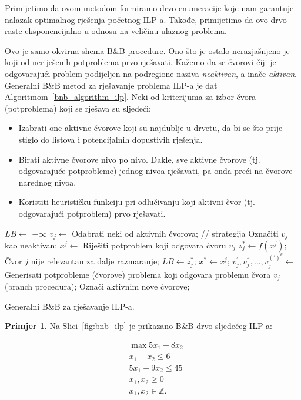 \documentclass[a4paper, utf8, 11pt, colorlinks]{book}
\theoremstyle{definition}
\newtheorem{primjer}{Primjer}[chapter]
\begin{document}
Primijetimo da ovom metodom formiramo drvo enumeracije koje nam garantuje nalazak optimalnog rješenja početnog ILP-a. Takođe, primijetimo da ovo drvo raste eksponencijalno u odnosu na veličinu ulaznog problema. 

  Ovo je samo okvirna shema B\&B procedure. Ono što je ostalo nerazjašnjeno je koji od neriješenih potproblema prvo rješavati. Kažemo da se čvorovi čiji je odgovarajući problem podijeljen na podregione naziva \emph{neaktivan}, a inače \emph{aktivan}. Generalni B\&B metod za rješavanje problema ILP-a je dat   Algoritmom~\ref{bnb_algorithm_ilp}.  Neki od kriterijuma za izbor čvora (potproblema) koji se rješava su sljedeći:
  \begin{itemize}
  	\item Izabrati one aktivne čvorove koji su najdublje u drvetu, da bi se što prije stiglo do listova i potencijalnih dopustivih rješenja.
  	\item Birati aktivne čvorove nivo po nivo. Dakle, sve aktivne čvorove (tj. odgovarajuće potprobleme) jednog nivoa   rješavati, pa onda preći na čvorove narednog nivoa. 
  	\item Koristiti heurističku funkciju pri odlučivanju koji aktivni čvor (tj. odgovarajući potproblem) prvo rješavati. 
  \end{itemize}

\begin{algorithm}[!ht] 
	\begin{algorithmic}[1] 
		\STATE $LB \gets$ $-\infty$
		\STATE  $v_j \gets$ Odabrati neki od aktivnih čvorova; // strategija
		\STATE  Označiti $v_j$ kao neaktivan;
		\STATE  $x^j \gets$ Riješiti potproblem koji odgovara čvoru $v_j$
		\STATE $z^*_j \gets f(x^j)$;
		\STATE Čvor $j$ nije relevantan za dalje razmaranje; 
		\ENDIF
		\STATE $LB \gets z^*_j$;
		\STATE $x^* \gets x^j$;
		\ENDIF
		\ENDIF
		\STATE $v_j^{'}, v_j^{''},\ldots, v_j^{(')^k}  \gets$ Generisati potprobleme (čvorove) problema koji odgovara problemu čvora $v_j$ (branch procedura);
		\STATE Označi aktivnim nove čvorove; 
		\ENDIF
		\ENDIF
		\ENDWHILE
	\end{algorithmic}
	\caption{Generalni B\&B za rješavanje ILP-a.}\label{bnb_algorithm_ilp}
\end{algorithm}
\begin{primjer}
Na Slici~\ref{fig:bnb_ilp} je prikazano B\&B drvo sljedećeg ILP-a:
\end{primjer}
\begin{align*}
    &\max 5 x_1 + 8 x_2 \\
    &x_1 + x_2 \leq 6 \\
    & 5 x_1 + 9 x_2 \leq 45 \\
    & x_1, x_2 \geq 0\\
    & x_1,x_2 \in \mathbb{Z}.
\end{align*}
\end{document}

